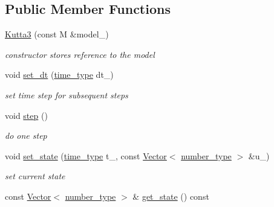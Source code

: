 \subsection*{Public Member Functions}
\begin{DoxyCompactItemize}
\item 
\hypertarget{classhdnum_1_1Kutta3_af743deba93833d61ae035a5c3eb5b563}{
\hyperlink{classhdnum_1_1Kutta3_af743deba93833d61ae035a5c3eb5b563}{Kutta3} (const M \&model\_\-)}
\label{classhdnum_1_1Kutta3_af743deba93833d61ae035a5c3eb5b563}

\begin{DoxyCompactList}\small\item\em constructor stores reference to the model \item\end{DoxyCompactList}\item 
\hypertarget{classhdnum_1_1Kutta3_ac5b0e2c4ae00e3d3faf7d83351f76866}{
void \hyperlink{classhdnum_1_1Kutta3_ac5b0e2c4ae00e3d3faf7d83351f76866}{set\_\-dt} (\hyperlink{classhdnum_1_1Kutta3_a0055d10b545c5cf60a16fd3a88a6042e}{time\_\-type} dt\_\-)}
\label{classhdnum_1_1Kutta3_ac5b0e2c4ae00e3d3faf7d83351f76866}

\begin{DoxyCompactList}\small\item\em set time step for subsequent steps \item\end{DoxyCompactList}\item 
\hypertarget{classhdnum_1_1Kutta3_a5c97bd9408b64f29052781b8a62180b4}{
void \hyperlink{classhdnum_1_1Kutta3_a5c97bd9408b64f29052781b8a62180b4}{step} ()}
\label{classhdnum_1_1Kutta3_a5c97bd9408b64f29052781b8a62180b4}

\begin{DoxyCompactList}\small\item\em do one step \item\end{DoxyCompactList}\item 
\hypertarget{classhdnum_1_1Kutta3_a474ab02413887a0c1fadb81a7e4fb851}{
void \hyperlink{classhdnum_1_1Kutta3_a474ab02413887a0c1fadb81a7e4fb851}{set\_\-state} (\hyperlink{classhdnum_1_1Kutta3_a0055d10b545c5cf60a16fd3a88a6042e}{time\_\-type} t\_\-, const \hyperlink{classhdnum_1_1Vector}{Vector}$<$ \hyperlink{classhdnum_1_1Kutta3_a06dc1fee934f3a4cbb530f4bc4704b99}{number\_\-type} $>$ \&u\_\-)}
\label{classhdnum_1_1Kutta3_a474ab02413887a0c1fadb81a7e4fb851}

\begin{DoxyCompactList}\small\item\em set current state \item\end{DoxyCompactList}\item 
\hypertarget{classhdnum_1_1Kutta3_add2141212e9549fd50e15deedf892b3e}{
const \hyperlink{classhdnum_1_1Vector}{Vector}$<$ \hyperlink{classhdnum_1_1Kutta3_a06dc1fee934f3a4cbb530f4bc4704b99}{number\_\-type} $>$ \& \hyperlink{classhdnum_1_1Kutta3_add2141212e9549fd50e15deedf892b3e}{get\_\-state} () const }
\label{classhdnum_1_1Kutta3_add2141212e9549fd50e15deedf892b3e}


\end{DoxyCompactItemize}
